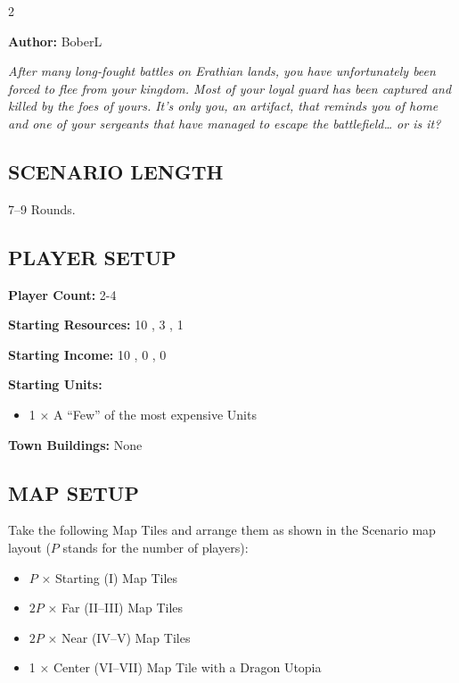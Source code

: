 
\begin{multicols}{2}

\textbf{Author:} BoberL

\textit{After many long-fought battles on Erathian lands, you have unfortunately been forced to flee from your kingdom. Most of your loyal guard has been captured and killed by the foes of yours. It’s only you, an artifact, that reminds you of home and one of your sergeants that have managed to escape the battlefield… or is it?}  %

\subsection*{\MakeUppercase{Scenario Length}}
7--9 Rounds.

\subsection*{\MakeUppercase{Player Setup}}
\textbf{Player Count:} 2-4

\textbf{Starting Resources:} 10 , 3 , 1 

\textbf{Starting Income:} 10 , 0 , 0 

\textbf{Starting Units:}

\begin{itemize}
  \item 1 × A ``Few'' of the most expensive  Units
\end{itemize}

\textbf{Town Buildings:} None
\columnbreak
\subsection*{\MakeUppercase{Map Setup}}
Take the following Map Tiles and arrange them as shown in the Scenario map layout ($P$ stands for the number of players):

\begin{itemize}
  \item $P$ × Starting (I) Map Tiles
  \item $2P$ × Far (II--III) Map Tiles
  \item $2P$ × Near (IV--V) Map Tiles
  \item 1 × Center (VI--VII) Map Tile with a Dragon Utopia
\end{itemize}


\end{multicols}
